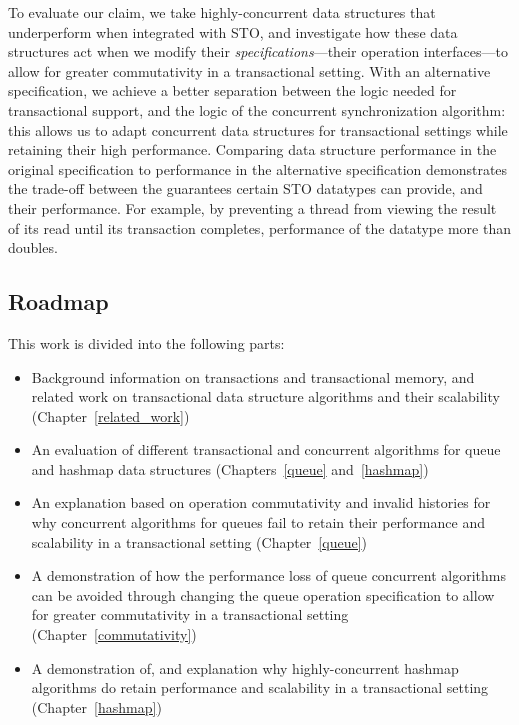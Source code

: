 To evaluate our claim, we take highly-concurrent data structures that underperform when integrated with STO, and investigate how these data structures act when we modify their \emph{specifications}---their operation interfaces---to allow for greater commutativity in a transactional setting. With an alternative specification, we achieve a better separation between the logic needed for transactional support, and the logic of the concurrent synchronization algorithm: this allows us to adapt concurrent data structures for transactional settings while retaining their high performance.
Comparing data structure performance in the original specification to performance in the alternative specification demonstrates the trade-off between the guarantees certain STO datatypes can provide, and their performance. For example, by preventing a thread from viewing the result of its read until its transaction completes, performance of the datatype more than doubles.

\subsection{Roadmap}
This work is divided into the following parts: 
\begin{itemize}
    \item Background information on transactions and transactional memory, and related work on transactional data structure algorithms and their scalability (Chapter~\ref{related_work})
    \item An evaluation of different transactional and concurrent algorithms for queue and hashmap data structures (Chapters~\ref{queue} and~\ref{hashmap})
    \item An explanation based on operation commutativity and invalid histories for why concurrent algorithms for queues fail to retain their performance and scalability in a transactional setting (Chapter~\ref{queue})
    \item A demonstration of how the performance loss of queue concurrent algorithms can be avoided through changing the queue operation specification to allow for greater commutativity in a transactional setting (Chapter~\ref{commutativity})
    \item A demonstration of, and explanation why highly-concurrent hashmap algorithms do retain performance and scalability in a transactional setting (Chapter~\ref{hashmap})
\end{itemize}
